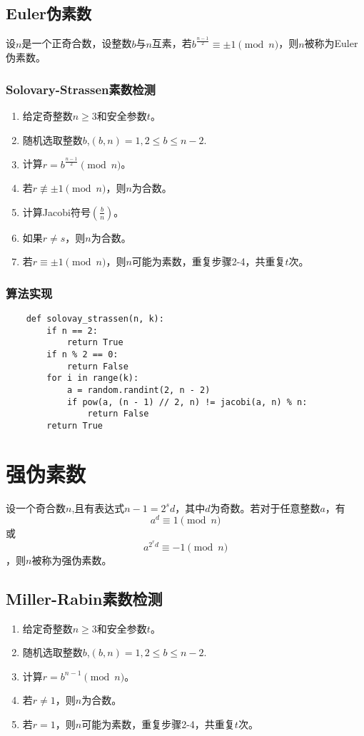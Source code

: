 \documentclass[a4paper]{article}
\begin{document}
\subsection{Euler伪素数}
设$n$是一个正奇合数，设整数$b$与$n$互素，若$b^{\frac{n-1}{2}}\equiv\pm1\pmod n$，则$n$被称为Euler伪素数。
\subsubsection{Solovary-Strassen素数检测}
\begin{enumerate}
    \item 给定奇整数$n\geq3$和安全参数$t$。
    \item 随机选取整数$b$,$(b,n)=1,2\leq b\leq n-2$.
    \item 计算$r=b^{\frac{n-1}{2}}\pmod n$。
    \item 若$r\not\equiv\pm1\pmod n$，则$n$为合数。
    \item 计算Jacobi符号$(\frac{b}{n})$。
    \item 如果$r\not=s $，则$n$为合数。
    \item 若$r\equiv\pm1\pmod n$，则$n$可能为素数，重复步骤2-4，共重复$t$次。
\end{enumerate}
\subsubsection{算法实现}
\begin{verbatim}
    def solovay_strassen(n, k):
        if n == 2:
            return True
        if n % 2 == 0:
            return False
        for i in range(k):
            a = random.randint(2, n - 2)
            if pow(a, (n - 1) // 2, n) != jacobi(a, n) % n:
                return False
        return True
\end{verbatim}
\section{强伪素数}
设一个奇合数$n$,且有表达式$n-1=2^sd$，其中$d$为奇数。若对于任意整数$a$，有$$a^d\equiv1\pmod n$$或$$a^{2^rd}\equiv-1\pmod n$$，则$n$被称为强伪素数。
\subsection{Miller-Rabin素数检测}
\begin{enumerate}
    \item 给定奇整数$n\geq3$和安全参数$t$。
    \item 随机选取整数$b$,$(b,n)=1,2\leq b\leq n-2$.
    \item 计算$r=b^{n-1}\pmod n$。
    \item 若$r\neq1$，则$n$为合数。
    \item 若$r=1$，则$n$可能为素数，重复步骤2-4，共重复$t$次。
\end{enumerate}
\end{document}
